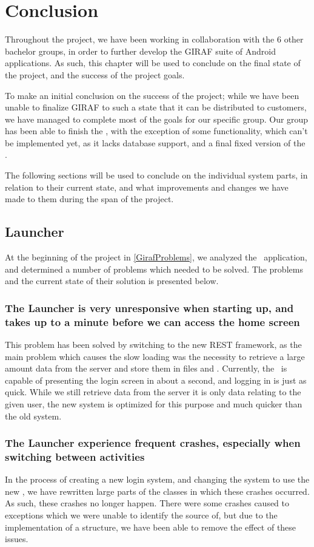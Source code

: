 \chapter{Conclusion}
Throughout the project, we have been working in collaboration with the 6 other
bachelor groups, in order to further develop the GIRAF suite of Android
applications. As such, this chapter will be used to conclude on the final state
of the project, and the success of the project goals.\nl

To make an initial conclusion on the success of the project; while we have been
unable to finalize GIRAF to such a state that it can be distributed to
customers, we have managed to complete most of the goals for our specific group.
Our group has been able to finish the \lapp, with the exception of some
functionality, which can't be implemented yet, as it lacks database support,
and a final fixed version of the \rlib.\nl

The following sections will be used to conclude on the individual system parts,
in relation to their current state, and what improvements and changes we have
made to them during the span of the project.

\section{Launcher}
At the beginning of the project in \autoref{GirafProblems}, we analyzed the
\lapp\ application, and determined a number of problems which needed to
be solved. The problems and the current state of their solution is presented below.

\subsection*{The Launcher is very unresponsive when starting up, and takes up to
a minute before we can access the home screen}
This problem has been solved by switching to the new REST framework, as the main
problem which causes the slow loading was the necessity to retrieve a large
amount data from the server and store them in files and .
Currently, the \lapp\ is capable of presenting the login screen in about a
second, and logging in is just as quick.
While we still retrieve data from the server it is only data relating to the
given user, the new system is optimized for this purpose and much quicker than
the old system.

\subsection*{The Launcher experience frequent crashes, especially when switching
between activities} In the process of creating a new login system, and changing
the system to use the new \rlib, we have rewritten large parts of the
classes in which these crashes occurred. As such, these crashes no longer
happen. There were some crashes caused to exceptions which we were unable to
identify the source of, but due to the implementation of a 
structure, we have been able to remove the effect of these issues.

